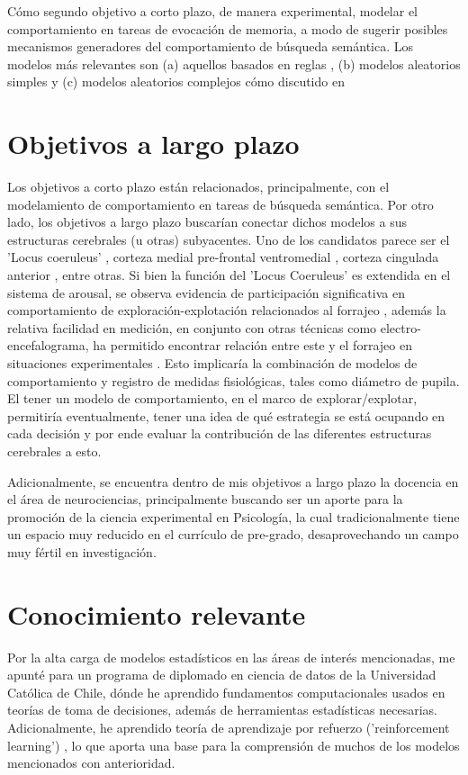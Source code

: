 \documentclass[11pt]{article}
\begin{document}
Cómo segundo objetivo a corto plazo, de manera experimental, modelar el
comportamiento en tareas de evocación de memoria, a modo de sugerir posibles
mecanismos generadores del comportamiento de búsqueda semántica. Los modelos más
relevantes son (a) aquellos basados en reglas
\citep{charnovOptimalForagingMarginal1976}, (b) modelos aleatorios simples
\citep{thompsonWalkingWikipediaScalefree2014} y (c) modelos aleatorios complejos
cómo discutido en \citep{benhamouHowManyAnimals2007}
\section*{Objetivos a largo plazo}
\label{sec:org270b4e9}
Los objetivos a corto plazo están relacionados, principalmente, con el
modelamiento de comportamiento en tareas de búsqueda semántica. Por otro lado,
los objetivos a largo plazo buscarían conectar dichos modelos a sus estructuras
cerebrales (u otras) subyacentes. Uno de los candidatos parece ser el 'Locus
coeruleus' \citep{kaneIncreasedLocusCoeruleus2017}, corteza medial pre-frontal
ventromedial \citep{kollingNeuralMechanismsForaging2012}, corteza cingulada
anterior \citep{shenhavAnteriorCingulateEngagement2014}, entre otras. Si bien la
función del 'Locus Coeruleus' es extendida en el sistema de arousal, se observa
evidencia de participación significativa en comportamiento de
exploración-explotación relacionados al forrajeo
\citep{aston-jonesAdaptiveGainRole2005}, además la relativa facilidad en medición,
en conjunto con otras técnicas como electro-encefalograma, ha permitido
encontrar relación entre este y el forrajeo en situaciones experimentales
\citep{slanziCombiningEyeTracking2017}. Esto implicaría la combinación de modelos
de comportamiento y registro de medidas fisiológicas, tales como diámetro de
pupila. El tener un modelo de comportamiento, en el marco de explorar/explotar,
permitiría eventualmente, tener una idea de qué estrategia se está ocupando en
cada decisión y por ende evaluar la contribución de las diferentes estructuras
cerebrales a esto.

Adicionalmente, se encuentra dentro de mis objetivos a largo plazo la docencia
en el área de neurociencias, principalmente buscando ser un aporte para la
promoción de la ciencia experimental en Psicología, la cual tradicionalmente
tiene un espacio muy reducido en el currículo de pre-grado, desaprovechando un
campo muy fértil en investigación.
\section*{Conocimiento relevante}
\label{sec:orgc572141}
Por la alta carga de modelos estadísticos en las áreas de interés mencionadas,
me apunté para un programa de diplomado en ciencia de datos de la Universidad
Católica de Chile, dónde he aprendido fundamentos computacionales usados en
teorías de toma de decisiones, además de herramientas estadísticas necesarias.
Adicionalmente, he aprendido teoría de aprendizaje por refuerzo
('reinforcement learning') \citep{suttonReinforcementLearningDirect1992}, lo que
aporta una base para la comprensión de muchos de los modelos mencionados con
anterioridad.
\end{document}
